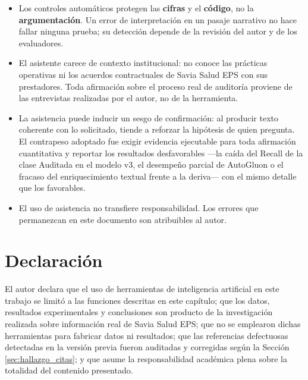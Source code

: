 \documentclass[12pt,letterpaper]{report}
\begin{document}
\begin{itemize}
    \item Los controles automáticos protegen las \textbf{cifras} y el \textbf{código},
    no la \textbf{argumentación}. Un error de interpretación en un pasaje narrativo no
    hace fallar ninguna prueba; su detección depende de la revisión del autor y de los
    evaluadores.

    \item El asistente carece de contexto institucional: no conoce las prácticas
    operativas ni los acuerdos contractuales de Savia Salud EPS con sus prestadores.
    Toda afirmación sobre el proceso real de auditoría proviene de las entrevistas
    realizadas por el autor, no de la herramienta.

    \item La asistencia puede inducir un sesgo de confirmación: al producir texto
    coherente con lo solicitado, tiende a reforzar la hipótesis de quien pregunta. El
    contrapeso adoptado fue exigir evidencia ejecutable para toda afirmación
    cuantitativa y reportar los resultados desfavorables —la caída del Recall de la
    clase Auditada en el modelo v3, el desempeño parcial de AutoGluon o el fracaso del
    enriquecimiento textual frente a la deriva— con el mismo detalle que los favorables.

    \item El uso de asistencia no transfiere responsabilidad. Los errores que
    permanezcan en este documento son atribuibles al autor.
\end{itemize}

\section{Declaración}

El autor declara que el uso de herramientas de inteligencia artificial en este trabajo
se limitó a las funciones descritas en este capítulo; que los datos, resultados
experimentales y conclusiones son producto de la investigación realizada sobre
información real de Savia Salud EPS; que no se emplearon dichas herramientas para
fabricar datos ni resultados; que las referencias defectuosas detectadas en la versión
previa fueron auditadas y corregidas según la Sección \ref{sec:hallazgo_citas}; y que asume la responsabilidad académica
plena sobre la totalidad del contenido presentado.
\end{document}
